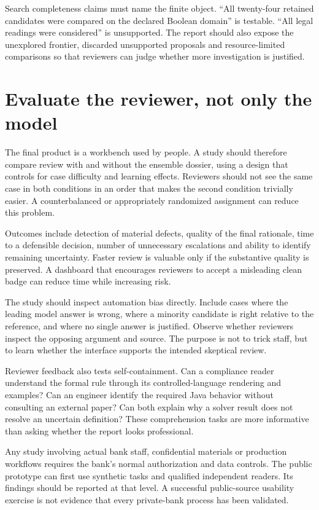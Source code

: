 \documentclass[12pt,a4paper,oneside,openany]{book}
\begin{document}
Search completeness claims must name the finite object. ``All twenty-four retained
candidates were compared on the declared Boolean domain'' is testable. ``All legal
readings were considered'' is unsupported. The report should also expose the
unexplored frontier, discarded unsupported proposals and resource-limited
comparisons so that reviewers can judge whether more investigation is justified.

\section{Evaluate the reviewer, not only the model}

The final product is a workbench used by people. A study should therefore compare
review with and without the ensemble dossier, using a design that controls for
case difficulty and learning effects. Reviewers should not see the same case in
both conditions in an order that makes the second condition trivially easier.
A counterbalanced or appropriately randomized assignment can reduce this problem.

Outcomes include detection of material defects, quality of the final rationale,
time to a defensible decision, number of unnecessary escalations and ability to
identify remaining uncertainty. Faster review is valuable only if the substantive
quality is preserved. A dashboard that encourages reviewers to accept a misleading
clean badge can reduce time while increasing risk.

The study should inspect automation bias directly. Include cases where the
leading model answer is wrong, where a minority candidate is right relative to
the reference, and where no single answer is justified. Observe whether reviewers
inspect the opposing argument and source. The purpose is not to trick staff, but
to learn whether the interface supports the intended skeptical review.

Reviewer feedback also tests self-containment. Can a compliance reader understand
the formal rule through its controlled-language rendering and examples? Can an
engineer identify the required Java behavior without consulting an external paper?
Can both explain why a solver result does not resolve an uncertain definition?
These comprehension tasks are more informative than asking whether the report
looks professional.

Any study involving actual bank staff, confidential materials or production
workflows requires the bank's normal authorization and data controls. The public
prototype can first use synthetic tasks and qualified independent readers.
Its findings should be reported at that level. A successful public-source
usability exercise is not evidence that every private-bank process has been
validated.
\end{document}
